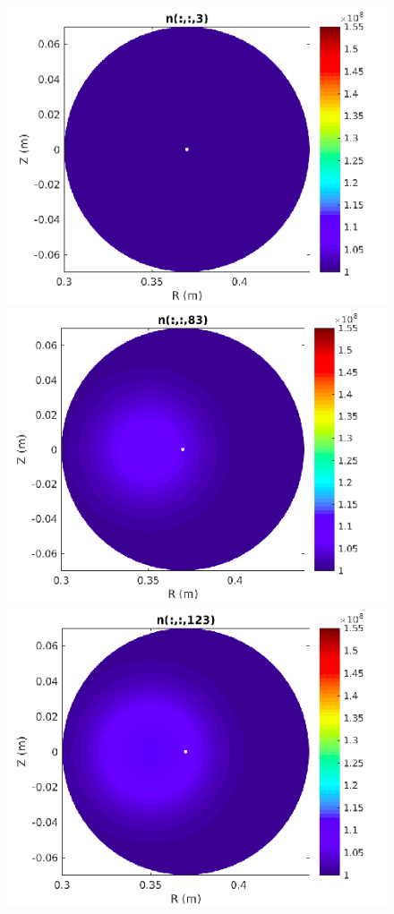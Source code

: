 \documentclass[12pt,oneside,a4paper]{abntex2}
\begin{document}
\begin{figure}[H]
\centering
\includegraphics[scale=0.4]{../SImulacao_breakdown/Adaptacao_nova/explicito/n3.png}  
\includegraphics[scale=0.4]{../SImulacao_breakdown/Adaptacao_nova/explicito/n83.png} 
\includegraphics[scale=0.4]{../SImulacao_breakdown/Adaptacao_nova/explicito/n123.png} 

\end{figure}
\end{document}
